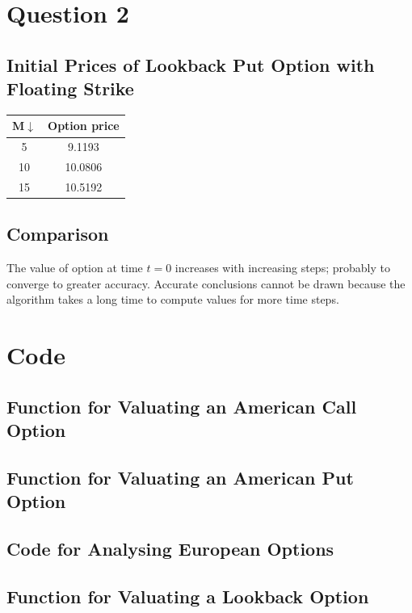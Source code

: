 \documentclass[12pt]{article}
\begin{document}
\begin{center}
    \end{center}

\section{Question 2}
  \subsection*{Initial Prices of Lookback Put Option with Floating Strike}
    \begin{center}
    \begin{tabular}{c|c}
    M$\downarrow$ &Option price\\ \hline
    5 &9.1193\\
    10 &10.0806\\
    15 &10.5192\\ \hline
    \end{tabular}
    \end{center}
  \subsection*{Comparison}
    The value of option at time $t = 0$ increases with increasing steps; probably to converge to greater accuracy. Accurate conclusions cannot be drawn because the algorithm takes a long time to compute values for more time steps.


\newpage
\section{Code}
  \subsection*{Function for Valuating an American Call Option}
     
  \subsection*{Function for Valuating an American Put Option}
     
  \subsection*{Code for Analysing European Options}
     
  \subsection*{Function for Valuating a Lookback Option}
     
\end{document}
